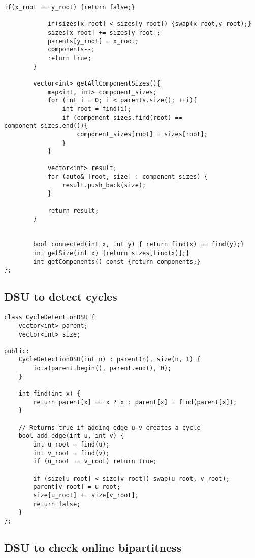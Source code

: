 \documentclass[10pt]{article}
\begin{document}
\begin{multicols*}{2}
\begin{lstlisting}[style=compactcpp]
            if(x_root == y_root) {return false;}

            if(sizes[x_root] < sizes[y_root]) {swap(x_root,y_root);}
            sizes[x_root] += sizes[y_root];
            parents[y_root] = x_root;
            components--;
            return true;
        }

        vector<int> getAllComponentSizes(){
            map<int, int> component_sizes;
            for (int i = 0; i < parents.size(); ++i){
                int root = find(i);
                if (component_sizes.find(root) == component_sizes.end()){
                    component_sizes[root] = sizes[root];
                }
            }

            vector<int> result;
            for (auto& [root, size] : component_sizes) {
                result.push_back(size);
            }

            return result;
        }


        bool connected(int x, int y) { return find(x) == find(y);}
        int getSize(int x) {return sizes[find(x)];}
        int getComponents() const {return components;}
};
\end{lstlisting}

\subsection{DSU to detect cycles}

\begin{lstlisting}[style=compactcpp]
class CycleDetectionDSU {
    vector<int> parent;
    vector<int> size;

public:
    CycleDetectionDSU(int n) : parent(n), size(n, 1) {
        iota(parent.begin(), parent.end(), 0);
    }

    int find(int x) {
        return parent[x] == x ? x : parent[x] = find(parent[x]);
    }

    // Returns true if adding edge u-v creates a cycle
    bool add_edge(int u, int v) {
        int u_root = find(u);
        int v_root = find(v);
        if (u_root == v_root) return true;
        
        if (size[u_root] < size[v_root]) swap(u_root, v_root);
        parent[v_root] = u_root;
        size[u_root] += size[v_root];
        return false;
    }
};
\end{lstlisting}

\subsection{DSU to check online bipartitness}


\end{multicols*}
\end{document}
